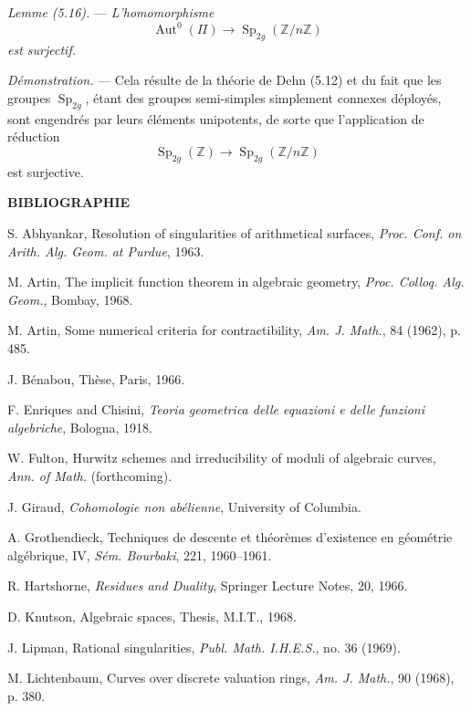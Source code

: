 \documentclass[10pt]{article}
\newcommand{\Aut}{\operatorname{Aut}}
\begin{document}
\medskip
\noindent\emph{Lemme (5.16).} --- \emph{L'homomorphisme}
\[
\Aut^0(\Pi)\longrightarrow \operatorname{Sp}_{2g}(\mathbb Z/n\mathbb Z)
\]
\emph{est surjectif.}

\noindent\emph{Démonstration.} --- Cela résulte de la théorie de Dehn (5.12) et du fait que les groupes $\operatorname{Sp}_{2g}$, étant des groupes semi-simples simplement connexes déployés, sont engendrés par leurs éléments unipotents, de sorte que l'application de réduction
\[
\operatorname{Sp}_{2g}(\mathbb Z)\longrightarrow \operatorname{Sp}_{2g}(\mathbb Z/n\mathbb Z)
\]
est surjective.

\begin{center}
{\bfseries BIBLIOGRAPHIE}
\end{center}

\begin{description}[leftmargin=2.4em,labelwidth=2.1em,itemsep=0.05em]
\item[{[Ab]}] S. Abhyankar, Resolution of singularities of arithmetical surfaces, \emph{Proc. Conf. on Arith. Alg. Geom. at Purdue}, 1963.
\item[{[A$_1$]}] M. Artin, The implicit function theorem in algebraic geometry, \emph{Proc. Colloq. Alg. Geom.}, Bombay, 1968.
\item[{[A$_2$]}] M. Artin, Some numerical criteria for contractibility, \emph{Am. J. Math.}, 84 (1962), p. 485.
\item[{[B]}] J. Bénabou, Thèse, Paris, 1966.
\item[{[E]}] F. Enriques and Chisini, \emph{Teoria geometrica delle equazioni e delle funzioni algebriche}, Bologna, 1918.
\item[{[F]}] W. Fulton, Hurwitz schemes and irreducibility of moduli of algebraic curves, \emph{Ann. of Math.} (forthcoming).
\item[{[G]}] J. Giraud, \emph{Cohomologie non abélienne}, University of Columbia.
\item[{[Gr]}] A. Grothendieck, Techniques de descente et théorèmes d'existence en géométrie algébrique, IV, \emph{Sém. Bourbaki}, 221, 1960--1961.
\item[{[H]}] R. Hartshorne, \emph{Residues and Duality}, Springer Lecture Notes, 20, 1966.
\item[{[K]}] D. Knutson, Algebraic spaces, Thesis, M.I.T., 1968.
\item[{[Li]}] J. Lipman, Rational singularities, \emph{Publ. Math. I.H.E.S.}, no. 36 (1969).
\item[{[L]}] M. Lichtenbaum, Curves over discrete valuation rings, \emph{Am. J. Math.}, 90 (1968), p. 380.

\end{description}
\end{document}
